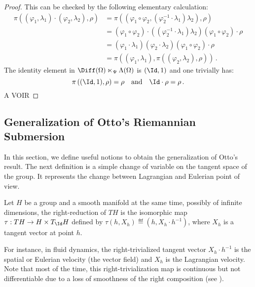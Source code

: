 \begin{proof}
  This can be checked by the following elementary calculation:
\begin{align*}
	\pi\left( (\varphi_1,\lambda_1) \cdot (\varphi_2,\lambda_2), \rho \right) 
	&= \pi \left((\varphi_1 \circ \varphi_2,( \varphi_2^{-1} \cdot \lambda_1) \lambda_2 ),\rho \right) \\ 
	& = (\varphi_1 \circ \varphi_2) \cdot (( \varphi_2^{-1} \cdot \lambda_1) \lambda_2 ) (\varphi_1 \circ \varphi_2) \cdot \rho \\ 
	& = (\varphi_1 \cdot \lambda_1) (\varphi_2 \cdot \lambda_2 )(\varphi_1\circ \varphi_2) \cdot \rho \\
	& = \pi \left( (\varphi_1,\lambda_1), \pi\left( (\varphi_2,\lambda_2), \rho \right) \right)\,.
\end{align*}
The identity element in $\Diff(\Omega) \ltimes_\Psi \Lambda(\Omega)$ is $(\Id,1)$ and one trivially has:
\begin{equation*}
	\pi\left(  (\Id,1), \rho \right) =   \rho
	\quad\text{and}\quad
 	\Id \cdot \rho = \rho \,.
\end{equation*}
A VOIR
\end{proof}

\subsection{Generalization of Otto's Riemannian Submersion}

In this section, we define useful notions to obtain the generalization of Otto's result. %
The next definition is a simple change of variable on the tangent space of the group. It represents the change between Lagrangian and Eulerian point of view.
\begin{definition}
Let $H$ be a group and a smooth manifold at the same time, possibly of infinite dimensions, the right-reduction of $TH$ is the isomorphic map $\tau : T H \rightarrow H \times T_{\Id} H$ defined by $\tau(h,X_h) \eqdef (h, X_h \cdot h^{-1})$, where $X_h$ is a tangent vector at point $h$.
\end{definition}
For instance, in fluid dynamics, the right-trivialized tangent vector $X_h \cdot h^{-1}$ is the spatial or Eulerian velocity (the vector field) and $X_h$ is the Lagrangian velocity.
Note that most of the time, this right-trivialization map is continuous but not differentiable due to a loss of smoothness of the right composition (see \cite{em70}). 

